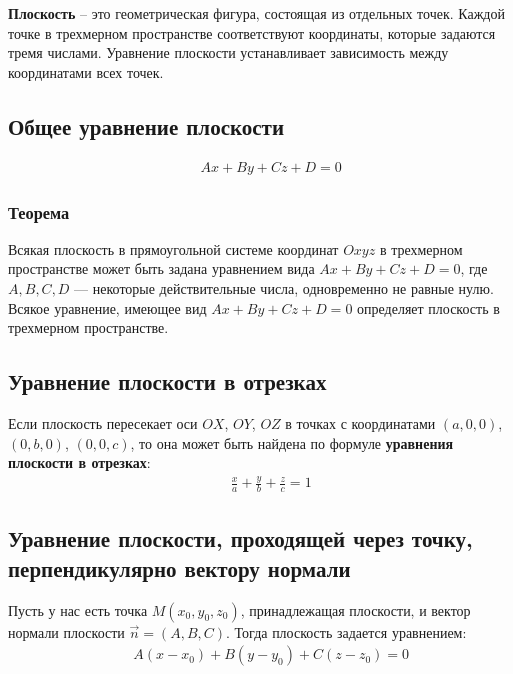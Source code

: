 \documentclass[12pt, fleqn]{extarticle}
\begin{document}
\textbf{Плоскость} – это геометрическая фигура, состоящая из отдельных точек. Каждой точке в трехмерном пространстве соответствуют координаты, которые задаются тремя числами. Уравнение плоскости устанавливает зависимость между координатами всех точек.

\subsection*{Общее уравнение плоскости}
\begin{align*}
     &  &
    Ax + By + Cz + D = 0
\end{align*}
\subsubsection*{Теорема}
Всякая плоскость в прямоугольной системе координат \(Oxyz\) в трехмерном пространстве может быть задана уравнением вида \(Ax + By + Cz + D = 0\), где \(A, B, C, D\) — некоторые действительные числа, одновременно не равные нулю. Всякое уравнение, имеющее вид \(Ax + By + Cz + D = 0\) определяет плоскость в трехмерном пространстве.


\subsection*{Уравнение плоскости в отрезках}
Если плоскость пересекает оси \(OX\), \(OY\), \(OZ\) в точках с координатами \((a, 0, 0)\), \((0, b, 0)\), \((0, 0, c)\), то она может быть найдена по формуле \textbf{уравнения плоскости в отрезках}:
\begin{align*}
     &  &
    \frac{x}{a} + \frac{y}{b} + \frac{z}{c} = 1
\end{align*}


\subsection*{Уравнение плоскости, проходящей через точку, перпендикулярно вектору нормали}
Пусть у нас есть точка \(M(x_0, y_0, z_0)\), принадлежащая плоскости, и вектор нормали плоскости \(\overrightarrow{n} = (A, B, C)\). Тогда плоскость задается уравнением:
\begin{align*}
     &  &
    A(x - x_0) + B(y - y_0) + C(z - z_0) = 0
\end{align*}

\end{document}
